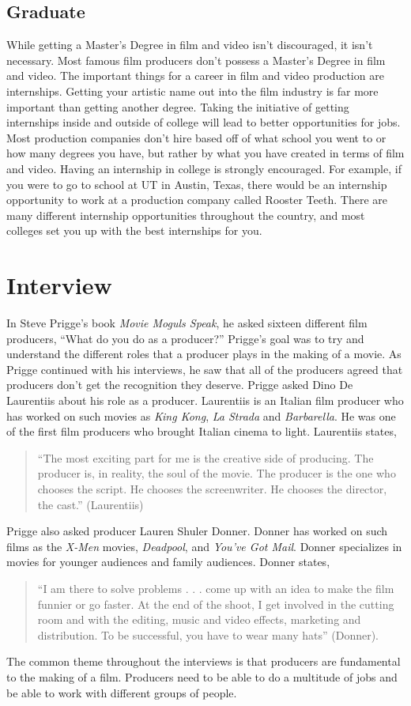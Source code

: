 \begin{multicols}{2}
    \subsection{Graduate}
		While getting a Master’s Degree in film and video isn’t discouraged, it isn’t necessary. Most famous film producers don’t possess a Master's Degree in film and video. The important things for a career in film and video production are internships. Getting your artistic name out into the film industry is far more important than getting another degree. Taking the initiative of getting internships inside and outside of college will lead to better opportunities for jobs. Most production companies don’t hire based off of what school you went to or how many degrees you have, but rather by what you have created in terms of film and video. Having an internship in college is strongly encouraged. For example, if you were to go to school at UT in Austin, Texas, there would be an internship opportunity to work at a production company called Rooster Teeth. There are many different internship opportunities throughout the country, and most colleges set you up with the best internships for you. 

\section{Interview}
	In Steve Prigge’s book \textit{Movie Moguls Speak}, he asked sixteen different film producers, “What do you do as a producer?” Prigge’s goal was to try and understand the different roles that a producer plays in the making of a movie. As Prigge continued with his interviews, he saw that all of the producers agreed that producers don’t get the recognition they deserve. 
	Prigge asked Dino De Laurentiis about his role as a producer. Laurentiis is an Italian film producer who has worked on such movies as \textit{King Kong}, \textit{La Strada} and \textit{Barbarella}. He was one of the first film producers who brought Italian cinema to light. Laurentiis states, 
\begin{quote}
	“The most exciting part for me is the creative side of producing. The producer is, in reality, the soul of the movie. The producer is the one who chooses the script. He chooses the screenwriter. He chooses the director, the cast.” (Laurentiis) 
\end{quote}
	Prigge also asked producer Lauren Shuler Donner. Donner has worked on such films as the \textit{X-Men} movies, \textit{Deadpool}, and \textit{You’ve Got Mail}. Donner specializes in movies for younger audiences and family audiences. Donner states,
\begin{quote}
	“I am there to solve problems . . . come up with an idea to make the film funnier or go faster. At the end of the shoot, I get involved in the cutting room and with the editing, music and video effects, marketing and distribution. To be successful, you have to wear many hats” (Donner).
\end{quote}
	The common theme throughout the interviews is that producers are fundamental to the making of a film. Producers need to be able to do a multitude of jobs and be able to work with different groups of people.


\end{multicols}
